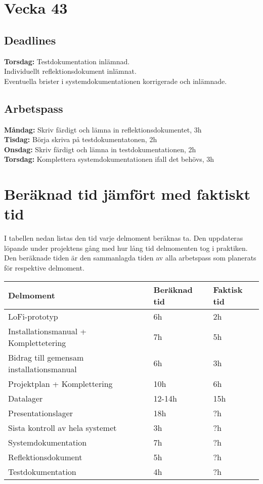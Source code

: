 \documentclass{TDP003mall}
\begin{document}
\section*{Vecka 43}
\subsection*{Deadlines}
\textbf{Torsdag: }Testdokumentation inlämnad.\\
\-\hspace{47pt}Individuellt reflektionsdokument inlämnat.\\
\-\hspace{47pt}Eventuella brister i systemdokumentationen korrigerade och inlämnade. 

\subsection*{Arbetspass}
\textbf{Måndag: }Skriv färdigt och lämna in reflektionsdokumentet, 3h\\
\textbf{Tisdag: }Börja skriva på testdokumentatonen, 2h\\
\textbf{Onsdag: }Skriv färdigt och lämna in testdokumentationen, 2h\\
\textbf{Torsdag: }Komplettera systemdokumentationen ifall det behövs, 3h\\
\newpage
\section{Beräknad tid jämfört med faktiskt tid}
I tabellen nedan listas den tid varje delmoment beräknas ta. Den uppdateras löpande under projektens gång med hur lång tid delmomenten tog i praktiken. Den beräknade tiden är den sammanlagda tiden av alla arbetspass som planerats för respektive delmoment.
\begin{table}[!h]
\begin{tabularx}{\linewidth}{|X|l|l|}
\hline
Delmoment & Beräknad tid  & Faktisk tid \\\hline
LoFi-prototyp & 6h & 2h \\\hline
Installationsmanual + Komplettetering & 7h & 5h \\\hline
Bidrag till gemensam installationsmanual & 6h & 3h\\\hline
Projektplan + Komplettering & 10h & 6h \\\hline
Datalager & 12-14h & 15h\\\hline
Presentationslager & 18h & ?h\\\hline
Sista kontroll av hela systemet & 3h & ?h\\\hline
Systemdokumentation & 7h & ?h\\\hline
Reflektionsdokument & 5h & ?h\\\hline
Testdokumentation & 4h & ?h\\\hline
\end{tabularx}
\end{table}
\end{document}
